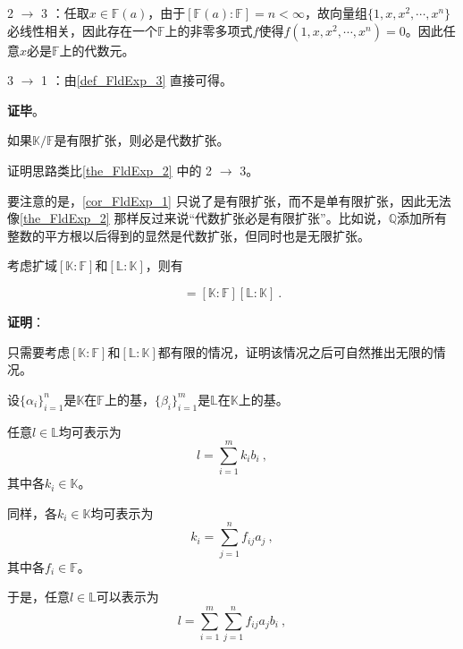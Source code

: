 2 $\to$ 3 ：任取$x\in\mathbb{F}(a)$，由于$[\mathbb{F}(a):\mathbb{F}]=n<\infty$，故向量组$\{1, x, x^2, \cdots, x^n\}$必线性相关，因此存在一个$\mathbb{F}$上的非零多项式$f$使得$f(1, x, x^2, \cdots, x^n)=0$。因此任意$x$必是$\mathbb{F}$上的代数元。

3 $\to$ 1 ：由\autoref{def_FldExp_3} 直接可得。

\textbf{证毕}。

\begin{corollary}{}\label{cor_FldExp_1}
如果$\mathbb{K}/\mathbb{F}$是有限扩张，则必是代数扩张。
\end{corollary}

证明思路类比\autoref{the_FldExp_2} 中的 2 $\to$ 3。

要注意的是，\autoref{cor_FldExp_1} 只说了是有限扩张，而不是单有限扩张，因此无法像\autoref{the_FldExp_2} 那样反过来说“代数扩张必是有限扩张”。比如说，$\mathbb{Q}$添加所有整数的平方根以后得到的显然是代数扩张，但同时也是无限扩张。





\begin{theorem}{}\label{the_FldExp_3}
考虑扩域$[\mathbb{K}:\mathbb{F}]$和$[\mathbb{L}:\mathbb{K}]$，则有

\begin{equation}
[\mathbb{L}:\mathbb{F}]=[\mathbb{K}:\mathbb{F}][\mathbb{L}:\mathbb{K}]~.
\end{equation}

\end{theorem}

\textbf{证明}：

只需要考虑$[\mathbb{K}:\mathbb{F}]$和$[\mathbb{L}:\mathbb{K}]$都有限的情况，证明该情况之后可自然推出无限的情况。

设$\{\alpha_i\}_{i=1}^{n}$是$\mathbb{K}$在$\mathbb{F}$上的基，$\{\beta_i\}_{i=1}^{m}$是$\mathbb{L}$在$\mathbb{K}$上的基。

任意$l\in\mathbb{L}$均可表示为
\begin{equation}
l = \sum_{i=1}^m k_ib_i~,
\end{equation}
其中各$k_i\in\mathbb{K}$。

同样，各$k_i\in\mathbb{K}$均可表示为
\begin{equation}
k_i = \sum_{j=1}^n f_{ij}a_j~,
\end{equation}
其中各$f_i\in\mathbb{F}$。

于是，任意$l\in\mathbb{L}$可以表示为
\begin{equation}
l = \sum_{i=1}^m \sum_{j=1}^n f_{ij}a_jb_i~,
\end{equation}

